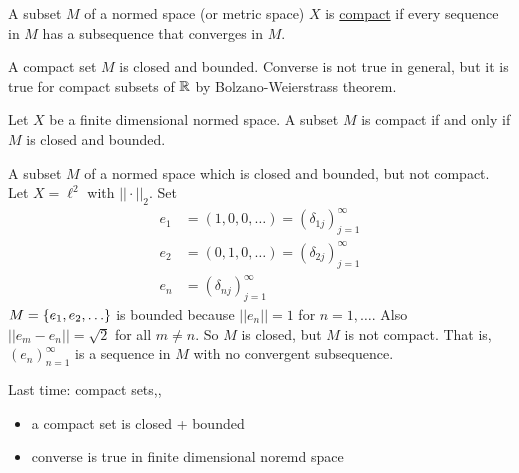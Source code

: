 \documentclass[]{article}
\begin{document}
\newpage

\begin{definition}
	A subset $M$ of a normed space (or metric space) $X$ is \ul{compact} if every sequence in $M$ has a subsequence that converges in $M$.
\end{definition}
\begin{lemma}
	A compact set $M$ is closed and bounded.
	Converse is not true in general, but it is true for compact subsets of $\mathbb{R}$ by Bolzano-Weierstrass theorem.
\end{lemma}
\begin{theorem}
	Let $X$ be a finite dimensional normed space.
	A subset $M$ is compact if and only if $M$ is closed and bounded.
\end{theorem}
\begin{example}
	A subset $M$ of a normed space which is closed and bounded, but not compact.
	Let $X = \ell^2$ with $||\cdot||_2$.
	Set 
	\begin{align*}
		e_1 &= (1,0,0,\dots) = (\delta_{1j})_{j=1}^\infty \\
		e_2 &= (0,1,0,\dots) = (\delta_{2j})_{j=1}^\infty \\
		e_n &= (\delta_{nj})_{j=1}^\infty
	\end{align*}
	$M = \set{e_1,e_2,\dots}$ is bounded because $||e_n||=1$ for $n=1,\dots$.
	Also $||e_m-e_n|| = \sqrt2$ for all $m\neq n$.
	So $M$ is closed, but $M$ is not compact.
	That is, $(e_n)_{n=1}^\infty$ is a sequence in $M$ with no convergent subsequence.
\end{example}

Last time: compact sets,,
\begin{itemize}
	\item a compact set is closed + bounded
	\item converse is true in finite dimensional noremd space
\end{itemize}
\end{document}
